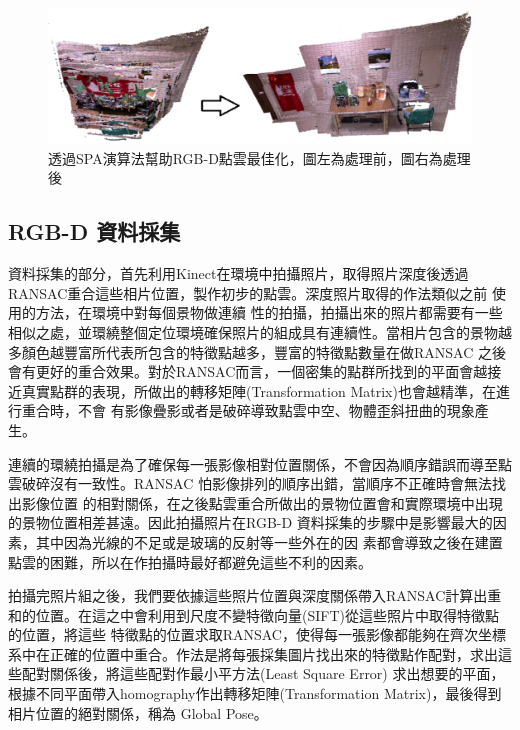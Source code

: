 \begin{figure}
\begin{center}
  \includegraphics[width=1.0\textwidth]{figures/consistent_PL.eps}
  \caption{透過SPA演算法幫助RGB-D點雲最佳化，圖左為處理前，圖右為處理後}
  \label{fig:Consistent_PL}
\end{center}
\end{figure}   
   
\subsection{RGB-D 資料採集}

	資料採集的部分，首先利用Kinect在環境中拍攝照片，取得照片深度後透過RANSAC重合這些相片位置，製作初步的點雲。深度照片取得的作法類似之前 \cite{Du2011}使用的方法，在環境中對每個景物做連續
性的拍攝，拍攝出來的照片都需要有一些相似之處，並環繞整個定位環境確保照片的組成具有連續性。當相片包含的景物越多顏色越豐富所代表所包含的特徵點越多，豐富的特徵點數量在做RANSAC
之後會有更好的重合效果。對於RANSAC而言，一個密集的點群所找到的平面會越接近真實點群的表現，所做出的轉移矩陣(Transformation Matrix)也會越精準，在進行重合時，不會
有影像疊影或者是破碎導致點雲中空、物體歪斜扭曲的現象產生。

連續的環繞拍攝是為了確保每一張影像相對位置關係，不會因為順序錯誤而導至點雲破碎沒有一致性。RANSAC 怕影像排列的順序出錯，當順序不正確時會無法找出影像位置
的相對關係，在之後點雲重合所做出的景物位置會和實際環境中出現的景物位置相差甚遠。因此拍攝照片在RGB-D 資料採集的步驟中是影響最大的因素，其中因為光線的不足或是玻璃的反射等一些外在的因
素都會導致之後在建置點雲的困難，所以在作拍攝時最好都避免這些不利的因素。
          
    拍攝完照片組之後，我們要依據這些照片位置與深度關係帶入RANSAC計算出重和的位置。在這之中會利用到尺度不變特徵向量(SIFT)從這些照片中取得特徵點的位置，將這些
特徵點的位置求取RANSAC，使得每一張影像都能夠在齊次坐標系中在正確的位置中重合。作法是將每張採集圖片找出來的特徵點作配對，求出這些配對關係後，將這些配對作最小平方法(Least Square Error)
求出想要的平面，根據不同平面帶入homography作出轉移矩陣(Transformation Matrix)，最後得到相片位置的絕對關係，稱為 Global Pose。

